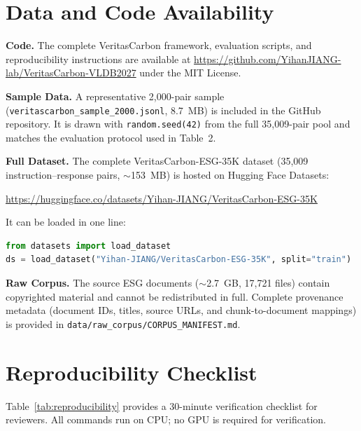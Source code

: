 \documentclass[sigconf,nonacm]{acmart}
\begin{document}
\appendix

\section{Data and Code Availability}

\noindent\textbf{Code.} The complete VeritasCarbon framework, evaluation scripts, and reproducibility instructions are available at \url{https://github.com/YihanJIANG-lab/VeritasCarbon-VLDB2027} under the MIT License.

\noindent\textbf{Sample Data.} A representative 2,000-pair sample (\texttt{veritascarbon\_sample\_2000.jsonl}, 8.7~MB) is included in the GitHub repository. It is drawn with \texttt{random.seed(42)} from the full 35,009-pair pool and matches the evaluation protocol used in Table~2.

\noindent\textbf{Full Dataset.} The complete VeritasCarbon-ESG-35K dataset (35,009 instruction--response pairs, $\sim$153~MB) is hosted on Hugging Face Datasets:
\begin{center}
\url{https://huggingface.co/datasets/Yihan-JIANG/VeritasCarbon-ESG-35K}
\end{center}
It can be loaded in one line:
\begin{lstlisting}[language=Python]
from datasets import load_dataset
ds = load_dataset("Yihan-JIANG/VeritasCarbon-ESG-35K", split="train")
\end{lstlisting}

\noindent\textbf{Raw Corpus.} The source ESG documents ($\sim$2.7~GB, 17,721 files) contain copyrighted material and cannot be redistributed in full. Complete provenance metadata (document IDs, titles, source URLs, and chunk-to-document mappings) is provided in \texttt{data/raw\_corpus/CORPUS\_MANIFEST.md}.

\section{Reproducibility Checklist}

Table~\ref{tab:reproducibility} provides a 30-minute verification checklist for reviewers. All commands run on CPU; no GPU is required for verification.
\end{document}
